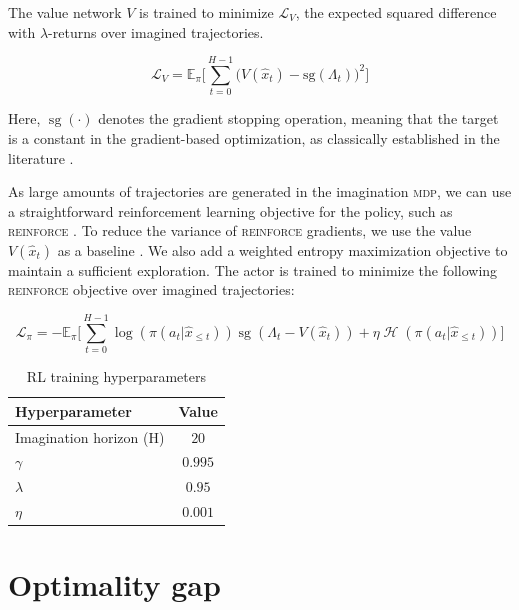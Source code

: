 The value network $V$ is trained to minimize $\mathcal{L}_V$, the expected squared difference with $\lambda$-returns over imagined trajectories. 

\begin{equation}
\mathcal{L}_V = \mathbb{E}_\pi \Big[ \sum_{t=0}^{H-1} \big( V(\hat{x}_t) - \mathrm{sg} ( \Lambda_t ) \big)^2 \Big]
\end{equation}

Here, $\operatorname{sg}(\cdot)$ denotes the gradient stopping operation, meaning that the target is a constant in the gradient-based optimization, as classically established in the literature \citep{dqn, rainbow, dreamerv1}. %

As large amounts of trajectories are generated in the imagination \textsc{mdp}, we can use a straightforward reinforcement learning objective for the policy, such as \textsc{reinforce} \citep{sutton}. To reduce the variance of \textsc{reinforce} gradients, we use the value $V(\hat{x}_t)$ as a baseline \citep{sutton}. We also add a weighted entropy maximization objective to maintain a sufficient exploration.  The actor is trained to minimize the following \textsc{reinforce} objective over imagined trajectories:  %

\begin{equation}
\mathcal{L}_\pi = - \mathbb{E}_\pi \Big[ \sum_{t=0}^{H-1} \log(\pi(a_t | \hat{x}_{\le t})) \operatorname{sg}(\Lambda_t - V(\hat{x}_t) ) + \eta \operatorname{\mathcal{H}}(\pi (a_t | \hat{x}_{\le t}))\Big]
\end{equation}

\begin{table}[h]
  \caption{RL training hyperparameters}
  \label{tables:rl_params}
  \centering
  \begin{tabular}{lc}
    \toprule
    Hyperparameter     & Value \\
    \midrule
    Imagination horizon (H) & $20$ \\
    $\gamma$ & $0.995$ \\
    $\lambda$ & $0.95$ \\
    $\eta$ & $0.001$ \\
    \bottomrule
  \end{tabular}
\end{table}

\newpage

\section{Optimality gap}
\label{appendix:metrics}

